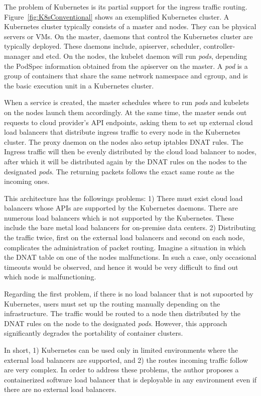 The problem of Kubernetes is its partial support for the ingress traffic routing.
Figure~\ref{fig:K8sConventional} shows an exemplified Kubernetes cluster.
A Kubernetes cluster typically consists of a master and nodes. They can be physical servers or VMs.
On the master, daemons that control the Kubernetes cluster are typically deployed. 
These daemons include, apiserver, scheduler, controller-manager and etcd. 
On the nodes, the kubelet daemon will run {\it pods}, depending the PodSpec information obtained from the apiserver on the master.
A {\em pod} is a group of containers that share the same network namespace and cgroup,
and is the basic execution unit in a Kubernetes cluster.

When a service is created, the master schedules where to run {\em pods} and kubelets on the nodes launch them accordingly.
At the same time, the master sends out requests to cloud provider's API endpoints, asking them to set up external cloud load balancers that distribute ingress traffic to every node in the Kubernetes cluster.
The proxy daemon on the nodes also setup iptables DNAT\cite{MartinA.Brown2017} rules. 
The Ingress traffic will then be evenly distributed by the cloud load balancer to nodes, 
after which it will be distributed again by the DNAT rules on the nodes to the designated {\em pods}. 
The returning packets follows the exact same route as the incoming ones.

This architecture has the followings problems: 
1) There must exist cloud load balancers whose APIs are supported by the Kubernetes daemons.
There are numerous load balancers which is not supported by the Kubernetes.
These include the bare metal load balancers for on-premise data centers.
2) Distributing the traffic twice, first on the external load balancers and second on each node, complicates the administration of packet routing. 
Imagine a situation in which the DNAT table on one of the nodes malfunctions.
In such a case, only occasional timeouts would be observed, and hence it would be very difficult to find out which node is malfunctioning.   

Regarding the first problem, if there is no load balancer that is not supoorted by Kubernetes, users must set up the routing manually depending on the infrastructure.
The traffic would be routed to a node then distributed by the DNAT rules on the node to the designated {\em pods}.
However, this approach significantly degrades the portability of container clusters.

In short, 1) Kubernetes can be used only in limited environments where the external load balancers are supported, and 2) the routes incoming traffic follow are very complex.
In order to address these problems, the author proposes a containerized software load balancer 
that is deployable in any environment even if there are no external load balancers.

